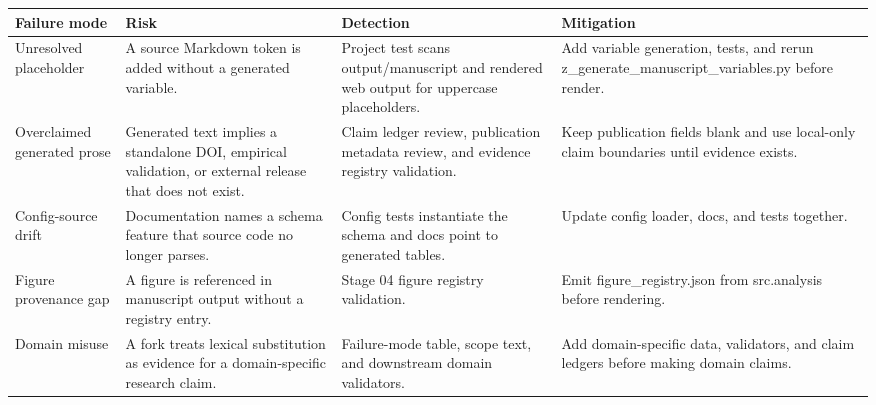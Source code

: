 \documentclass[
  english,
]{article}
\newcounter{none} %
\begin{document}
{\def\LTcaptype{none} %
\begin{longtable}[]{@{}
  >{\raggedright\arraybackslash}p{}
  >{\raggedright\arraybackslash}p{}
  >{\raggedright\arraybackslash}p{}
  >{\raggedright\arraybackslash}p{}@{}}
\toprule\noalign{}
\begin{minipage}[b]{\linewidth}\raggedright
Failure mode
\end{minipage} & \begin{minipage}[b]{\linewidth}\raggedright
Risk
\end{minipage} & \begin{minipage}[b]{\linewidth}\raggedright
Detection
\end{minipage} & \begin{minipage}[b]{\linewidth}\raggedright
Mitigation
\end{minipage} \\
\midrule\noalign{}
\endhead
\bottomrule\noalign{}
\endlastfoot
Unresolved placeholder & A source Markdown token is added without a
generated variable. & Project test scans output/manuscript and rendered
web output for uppercase placeholders. & Add variable generation, tests,
and rerun z\_generate\_manuscript\_variables.py before render. \\
Overclaimed generated prose & Generated text implies a standalone DOI,
empirical validation, or external release that does not exist. & Claim
ledger review, publication metadata review, and evidence registry
validation. & Keep publication fields blank and use local-only claim
boundaries until evidence exists. \\
Config-source drift & Documentation names a schema feature that source
code no longer parses. & Config tests instantiate the schema and docs
point to generated tables. & Update config loader, docs, and tests
together. \\
Figure provenance gap & A figure is referenced in manuscript output
without a registry entry. & Stage 04 figure registry validation. & Emit
figure\_registry.json from src.analysis before rendering. \\
Domain misuse & A fork treats lexical substitution as evidence for a
domain-specific research claim. & Failure-mode table, scope text, and
downstream domain validators. & Add domain-specific data, validators,
and claim ledgers before making domain claims. \\

\end{longtable}}
\end{document}
